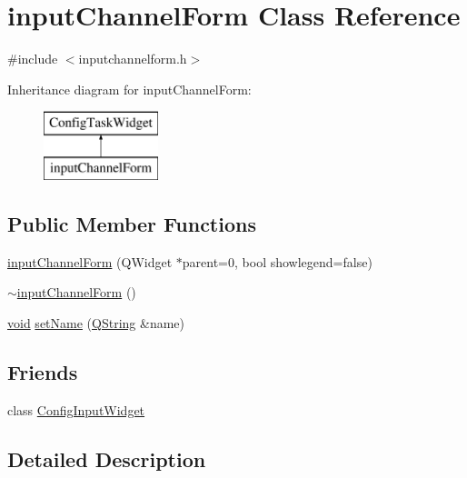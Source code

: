 \hypertarget{classinput_channel_form}{\section{input\-Channel\-Form \-Class \-Reference}
\label{classinput_channel_form}
}


{\ttfamily \#include $<$inputchannelform.\-h$>$}

\-Inheritance diagram for input\-Channel\-Form\-:\begin{figure}[H]
\begin{center}
\leavevmode
\includegraphics[height=2.000000cm]{classinput_channel_form}
\end{center}
\end{figure}
\subsection*{\-Public \-Member \-Functions}
\begin{DoxyCompactItemize}
\item 
\hyperlink{classinput_channel_form_a58524c5a5507c9459ab6caab1f1a49e8}{input\-Channel\-Form} (\-Q\-Widget $\ast$parent=0, bool showlegend=false)
\item 
\hyperlink{classinput_channel_form_ad20dfc97906fb50e1be3ab969ff22875}{$\sim$input\-Channel\-Form} ()
\item 
\hyperlink{group___u_a_v_objects_plugin_ga444cf2ff3f0ecbe028adce838d373f5c}{void} \hyperlink{classinput_channel_form_ada1f4f0465faa839c8c541b18ae01704}{set\-Name} (\hyperlink{group___u_a_v_objects_plugin_gab9d252f49c333c94a72f97ce3105a32d}{\-Q\-String} \&name)
\end{DoxyCompactItemize}
\subsection*{\-Friends}
\begin{DoxyCompactItemize}
\item 
class \hyperlink{classinput_channel_form_a2a08d48cca33c79f7765524beaac4767}{\-Config\-Input\-Widget}
\end{DoxyCompactItemize}


\subsection{\-Detailed \-Description}


